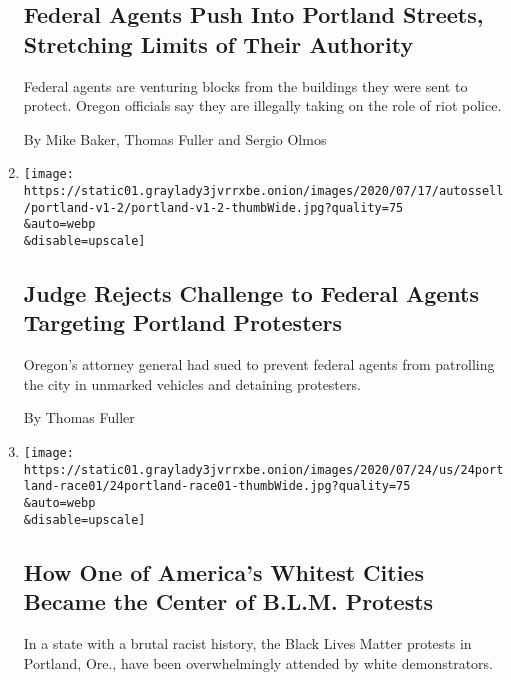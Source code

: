 \begin{enumerate}
  \hypertarget{federal-agents-push-into-portland-streets-stretching-limits-of-their-authority}{%
  \subsection{Federal Agents Push Into Portland Streets, Stretching
  Limits of Their
  Authority}\label{federal-agents-push-into-portland-streets-stretching-limits-of-their-authority}}

  Federal agents are venturing blocks from the buildings they were sent
  to protect. Oregon officials say they are illegally taking on the role
  of riot police.

  By Mike Baker, Thomas Fuller and Sergio Olmos
\item
  \href{/2020/07/24/us/portland-federal-jurisdiction-court-judge.html}{}

  \texttt{[image: https://static01.graylady3jvrrxbe.onion/images/2020/07/17/autossell/portland-v1-2/portland-v1-2-thumbWide.jpg?quality=75\\\&auto=webp\\\&disable=upscale]}

  \hypertarget{judge-rejects-challenge-to-federal-agents-targeting-portland-protesters}{%
  \subsection{Judge Rejects Challenge to Federal Agents Targeting
  Portland
  Protesters}\label{judge-rejects-challenge-to-federal-agents-targeting-portland-protesters}}

  Oregon's attorney general had sued to prevent federal agents from
  patrolling the city in unmarked vehicles and detaining protesters.

  By Thomas Fuller
\item
  \href{/2020/07/24/us/portland-oregon-protests-white-race.html}{}

  \texttt{[image: https://static01.graylady3jvrrxbe.onion/images/2020/07/24/us/24portland-race01/24portland-race01-thumbWide.jpg?quality=75\\\&auto=webp\\\&disable=upscale]}

  \hypertarget{how-one-of-americas-whitest-cities-became-the-center-of-blm-protests}{%
  \subsection{How One of America's Whitest Cities Became the Center of
  B.L.M.
  Protests}\label{how-one-of-americas-whitest-cities-became-the-center-of-blm-protests}}

  In a state with a brutal racist history, the Black Lives Matter
  protests in Portland, Ore., have been overwhelmingly attended by white
  demonstrators.


\end{enumerate}
